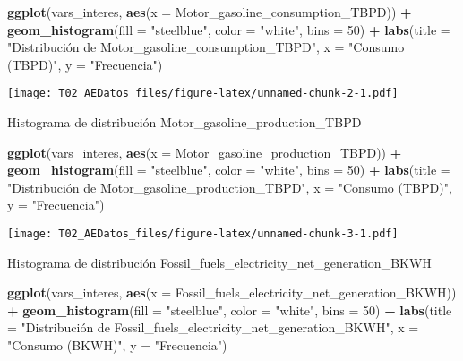 \documentclass[
]{article}
\newenvironment{Shaded}{\begin{snugshade}}{\end{snugshade}}
\newcommand{\AttributeTok}[1]{\textcolor[rgb]{0.13,0.29,0.53}{#1}}
\newcommand{\DecValTok}[1]{\textcolor[rgb]{0.00,0.00,0.81}{#1}}
\newcommand{\FunctionTok}[1]{\textcolor[rgb]{0.13,0.29,0.53}{\textbf{#1}}}
\newcommand{\NormalTok}[1]{#1}
\newcommand{\SpecialCharTok}[1]{\textcolor[rgb]{0.81,0.36,0.00}{\textbf{#1}}}
\newcommand{\StringTok}[1]{\textcolor[rgb]{0.31,0.60,0.02}{#1}}
\begin{document}
\begin{Shaded}
\begin{Highlighting}[]
\FunctionTok{ggplot}\NormalTok{(vars\_interes, }\FunctionTok{aes}\NormalTok{(}\AttributeTok{x =}\NormalTok{ Motor\_gasoline\_consumption\_TBPD)) }\SpecialCharTok{+}
  \FunctionTok{geom\_histogram}\NormalTok{(}\AttributeTok{fill =} \StringTok{"steelblue"}\NormalTok{, }\AttributeTok{color =} \StringTok{"white"}\NormalTok{, }\AttributeTok{bins =} \DecValTok{50}\NormalTok{) }\SpecialCharTok{+}
  \FunctionTok{labs}\NormalTok{(}\AttributeTok{title =} \StringTok{"Distribución de Motor\_gasoline\_consumption\_TBPD"}\NormalTok{,}
       \AttributeTok{x =} \StringTok{"Consumo (TBPD)"}\NormalTok{,}
       \AttributeTok{y =} \StringTok{"Frecuencia"}\NormalTok{)}
\end{Highlighting}
\end{Shaded}

\texttt{[image: T02\_AEDatos\_files/figure-latex/unnamed-chunk-2-1.pdf]}

Histograma de distribución Motor\_gasoline\_production\_TBPD

\begin{Shaded}
\begin{Highlighting}[]
\FunctionTok{ggplot}\NormalTok{(vars\_interes, }\FunctionTok{aes}\NormalTok{(}\AttributeTok{x =}\NormalTok{ Motor\_gasoline\_production\_TBPD)) }\SpecialCharTok{+}
  \FunctionTok{geom\_histogram}\NormalTok{(}\AttributeTok{fill =} \StringTok{"steelblue"}\NormalTok{, }\AttributeTok{color =} \StringTok{"white"}\NormalTok{, }\AttributeTok{bins =} \DecValTok{50}\NormalTok{) }\SpecialCharTok{+}
  \FunctionTok{labs}\NormalTok{(}\AttributeTok{title =} \StringTok{"Distribución de Motor\_gasoline\_production\_TBPD"}\NormalTok{,}
       \AttributeTok{x =} \StringTok{"Consumo (TBPD)"}\NormalTok{,}
       \AttributeTok{y =} \StringTok{"Frecuencia"}\NormalTok{)}
\end{Highlighting}
\end{Shaded}

\texttt{[image: T02\_AEDatos\_files/figure-latex/unnamed-chunk-3-1.pdf]}

Histograma de distribución
Fossil\_fuels\_electricity\_net\_generation\_BKWH

\begin{Shaded}
\begin{Highlighting}[]
\FunctionTok{ggplot}\NormalTok{(vars\_interes, }\FunctionTok{aes}\NormalTok{(}\AttributeTok{x =}\NormalTok{ Fossil\_fuels\_electricity\_net\_generation\_BKWH)) }\SpecialCharTok{+}
  \FunctionTok{geom\_histogram}\NormalTok{(}\AttributeTok{fill =} \StringTok{"steelblue"}\NormalTok{, }\AttributeTok{color =} \StringTok{"white"}\NormalTok{, }\AttributeTok{bins =} \DecValTok{50}\NormalTok{) }\SpecialCharTok{+}
  \FunctionTok{labs}\NormalTok{(}\AttributeTok{title =} \StringTok{"Distribución de Fossil\_fuels\_electricity\_net\_generation\_BKWH"}\NormalTok{,}
       \AttributeTok{x =} \StringTok{"Consumo (BKWH)"}\NormalTok{,}
       \AttributeTok{y =} \StringTok{"Frecuencia"}\NormalTok{)}
\end{Highlighting}
\end{Shaded}
\end{document}

